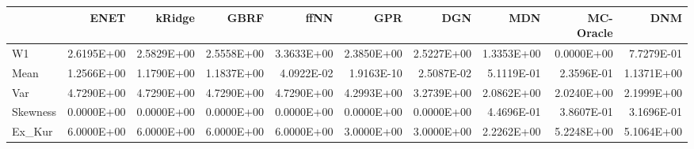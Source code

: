 \begin{tabular}{lrrrrrrrrr}
\toprule
{} &       ENET &     kRidge &       GBRF &       ffNN &        GPR &        DGN &        MDN &  MC-Oracle &        DNM \\
\midrule
W1       & 2.6195E+00 & 2.5829E+00 & 2.5558E+00 & 3.3633E+00 & 2.3850E+00 & 2.5227E+00 & 1.3353E+00 & 0.0000E+00 & 7.7279E-01 \\
Mean     & 1.2566E+00 & 1.1790E+00 & 1.1837E+00 & 4.0922E-02 & 1.9163E-10 & 2.5087E-02 & 5.1119E-01 & 2.3596E-01 & 1.1371E+00 \\
Var      & 4.7290E+00 & 4.7290E+00 & 4.7290E+00 & 4.7290E+00 & 4.2993E+00 & 3.2739E+00 & 2.0862E+00 & 2.0240E+00 & 2.1999E+00 \\
Skewness & 0.0000E+00 & 0.0000E+00 & 0.0000E+00 & 0.0000E+00 & 0.0000E+00 & 0.0000E+00 & 4.4696E-01 & 3.8607E-01 & 3.1696E-01 \\
Ex\_Kur   & 6.0000E+00 & 6.0000E+00 & 6.0000E+00 & 6.0000E+00 & 3.0000E+00 & 3.0000E+00 & 2.2262E+00 & 5.2248E+00 & 5.1064E+00 \\
\bottomrule
\end{tabular}

